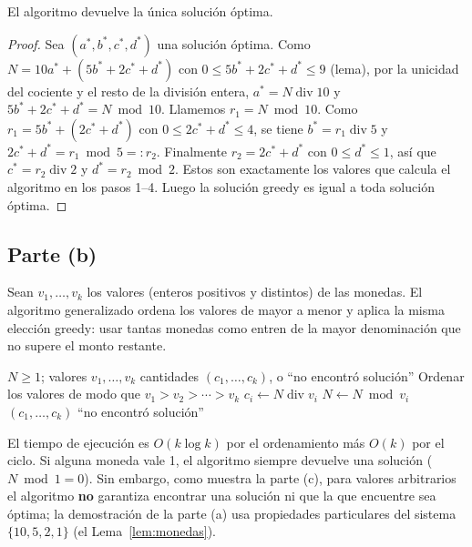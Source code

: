 \begin{teorema}
El algoritmo devuelve la única solución óptima.
\end{teorema}
\begin{proof}
Sea $(a^*,b^*,c^*,d^*)$ una solución óptima. Como $N=10a^*+(5b^*+2c^*+d^*)$ con
$0\le 5b^*+2c^*+d^*\le 9$ (lema), por la unicidad del cociente y el resto de la división entera,
$a^*=N\operatorname{div}10$ y $5b^*+2c^*+d^*=N\bmod 10$. Llamemos $r_1=N\bmod 10$. Como
$r_1=5b^*+(2c^*+d^*)$ con $0\le 2c^*+d^*\le4$, se tiene $b^*=r_1\operatorname{div}5$ y
$2c^*+d^*=r_1\bmod 5=:r_2$. Finalmente $r_2=2c^*+d^*$ con $0\le d^*\le1$, así que
$c^*=r_2\operatorname{div}2$ y $d^*=r_2\bmod 2$. Estos son exactamente los valores que calcula
el algoritmo en los pasos 1--4. Luego la solución greedy es igual a toda solución óptima.
\end{proof}

\subsection*{Parte (b)}
Sean $v_1,\dots,v_k$ los valores (enteros positivos y distintos) de las monedas. El algoritmo
generalizado ordena los valores de mayor a menor y aplica la misma elección greedy: usar tantas
monedas como entren de la mayor denominación que no supere el monto restante.

\begin{algorithm}[H]
\caption{Cambio greedy con valores arbitrarios}
\begin{algorithmic}[1]
\Require $N\ge1$; valores $v_1,\dots,v_k$
\Ensure cantidades $(c_1,\dots,c_k)$, o ``no encontró solución''
\State Ordenar los valores de modo que $v_1>v_2>\cdots>v_k$
  \State $c_i\gets N\operatorname{div} v_i$
  \State $N\gets N\bmod v_i$
\EndFor
{} \State \Return $(c_1,\dots,c_k)$
\Else \State \Return ``no encontró solución''
\EndIf
\end{algorithmic}
\end{algorithm}

El tiempo de ejecución es $O(k\log k)$ por el ordenamiento más $O(k)$ por el ciclo. Si alguna
moneda vale 1, el algoritmo siempre devuelve una solución ($N\bmod 1=0$). Sin embargo, como
muestra la parte (c), para valores arbitrarios el algoritmo \textbf{no} garantiza encontrar una
solución ni que la que encuentre sea óptima; la demostración de la parte (a) usa propiedades
particulares del sistema $\{10,5,2,1\}$ (el Lema~\ref{lem:monedas}).

